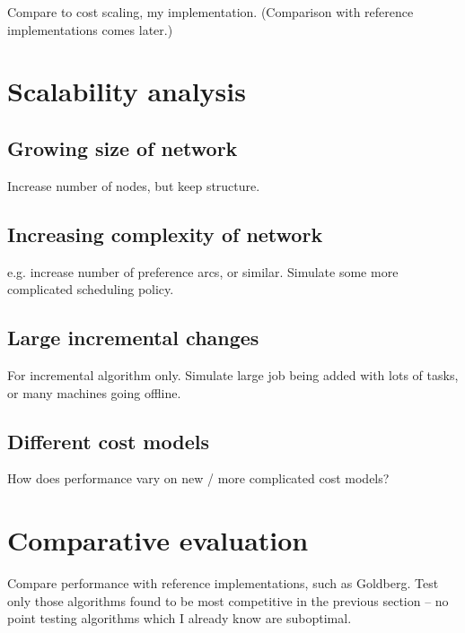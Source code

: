 Compare to cost scaling, my implementation. (Comparison with reference implementations comes later.) 

\section{Scalability analysis}

\subsection{Growing size of network}

Increase number of nodes, but keep structure.

\subsection{Increasing complexity of network}

e.g. increase number of preference arcs, or similar. Simulate some more complicated scheduling policy.

\subsection{Large incremental changes}

For incremental algorithm only. Simulate large job being added with lots of tasks, or many machines going offline.

\subsection{Different cost models}

How does performance vary on new / more complicated cost models?

\section{Comparative evaluation} \label{sec:eval-comparative}

Compare performance with reference implementations, such as Goldberg. Test only those algorithms found to be most competitive in the previous section -- no point testing algorithms which I already know are suboptimal.

